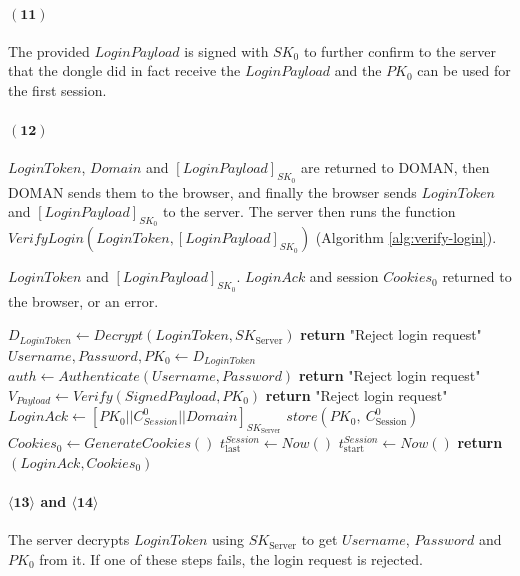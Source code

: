 \paragraph{$\boldsymbol{(11)}$} The provided $LoginPayload$ is signed with $SK_0$ to further confirm to the server that the dongle did in fact receive the $LoginPayload$ and the $PK_0$ can be used for the first session.
\paragraph{$\boldsymbol{(12)}$} $LoginToken$, $Domain$ and $[LoginPayload]_{SK_0}$ are returned to DOMAN, then DOMAN sends them to the browser, and finally the browser sends $LoginToken$ and $[LoginPayload]_{SK_0}$ to the server. The server then runs the function $VerifyLogin(LoginToken, [LoginPayload]_{SK_0})$ (Algorithm \ref{alg:verify-login}).

\begin{algorithm}[ht!]
\caption{$VerifyLogin(LoginToken, [LoginPayload]_{SK_0})$}
\begin{algorithmic}[1]
    \Require $LoginToken$ and $[LoginPayload]_{SK_0}$.
    \Ensure  $LoginAck$ and session $Cookies_0$ returned to the browser,
             or an error.

    \State $D_{LoginToken} \leftarrow Decrypt(LoginToken, SK_{\text{Server}})$
        \State \textbf{return} "Reject login request"
    \EndIf
    \State $Username, Password, PK_0 \leftarrow D_{LoginToken}$
    \State $auth \leftarrow Authenticate(Username, Password)$ 
        \State \textbf{return} "Reject login request"
    \EndIf
    \State $V_{Payload} \leftarrow Verify(SignedPayload, PK_0)$
        \State \textbf{return} "Reject login request"
    \EndIf
    \State $LoginAck \leftarrow [PK_0||C_{Session}^0||Domain]_{SK_{\text{Server}}}$
    \State $store(PK_0,\ C^0_{\text{Session}})$
    \State $Cookies_0 \leftarrow GenerateCookies()$
    \State $t^{Session}_{\text{last}} \leftarrow Now()$ 
    \State $t^{Session}_{\text{start}} \leftarrow Now()$
    \State \textbf{return} $(LoginAck, Cookies_0)$
\end{algorithmic}
\label{alg:verify-login}
\end{algorithm}

\paragraph{$\boldsymbol{\langle 13\rangle}$ and $\boldsymbol{\langle 14\rangle}$} The server decrypts $LoginToken$ using $SK_\text{Server}$ to get $Username$, $Password$ and $PK_0$ from it. If one of these steps fails, the login request is rejected.
